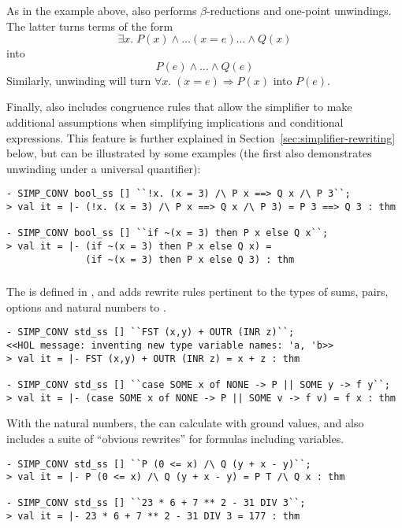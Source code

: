 As in the example above,  also performs
$\beta$-reductions and one-point unwindings.  The latter turns terms
of the form \[
\exists x.\;P(x)\land\dots (x = e) \dots\land Q(x)
\]
into
\[
P(e) \land \dots \land Q(e)
\]
Similarly, unwinding will turn $\forall x.\;(x = e)
\Rightarrow P(x)$ into $P(e)$.

Finally,  also includes congruence rules that allow
the simplifier to make additional assumptions when simplifying
implications and conditional expressions.  This feature is further
explained in Section~\ref{sec:simplifier-rewriting} below, but can be
illustrated by some examples (the first also demonstrates unwinding
under a universal quantifier):
\begin{session}
\begin{verbatim}
- SIMP_CONV bool_ss [] ``!x. (x = 3) /\ P x ==> Q x /\ P 3``;
> val it = |- (!x. (x = 3) /\ P x ==> Q x /\ P 3) = P 3 ==> Q 3 : thm

- SIMP_CONV bool_ss [] ``if ~(x = 3) then P x else Q x``;
> val it = |- (if ~(x = 3) then P x else Q x) =
              (if ~(x = 3) then P x else Q 3) : thm
\end{verbatim}
\end{session}

\subsubsection{}
%
%
The  \simpset{} is defined in , and adds
rewrite rules pertinent to the types of sums, pairs, options and
natural numbers to .
\begin{session}
\begin{verbatim}
- SIMP_CONV std_ss [] ``FST (x,y) + OUTR (INR z)``;
<<HOL message: inventing new type variable names: 'a, 'b>>
> val it = |- FST (x,y) + OUTR (INR z) = x + z : thm

- SIMP_CONV std_ss [] ``case SOME x of NONE -> P || SOME y -> f y``;
> val it = |- (case SOME x of NONE -> P || SOME v -> f v) = f x : thm
\end{verbatim}
\end{session}

With the natural numbers, the  \simpset{} can calculate
with ground values, and also includes a suite of ``obvious rewrites''
for formulas including variables.
\begin{session}
\begin{verbatim}
- SIMP_CONV std_ss [] ``P (0 <= x) /\ Q (y + x - y)``;
> val it = |- P (0 <= x) /\ Q (y + x - y) = P T /\ Q x : thm

- SIMP_CONV std_ss [] ``23 * 6 + 7 ** 2 - 31 DIV 3``;
> val it = |- 23 * 6 + 7 ** 2 - 31 DIV 3 = 177 : thm
\end{verbatim}
\end{session}

